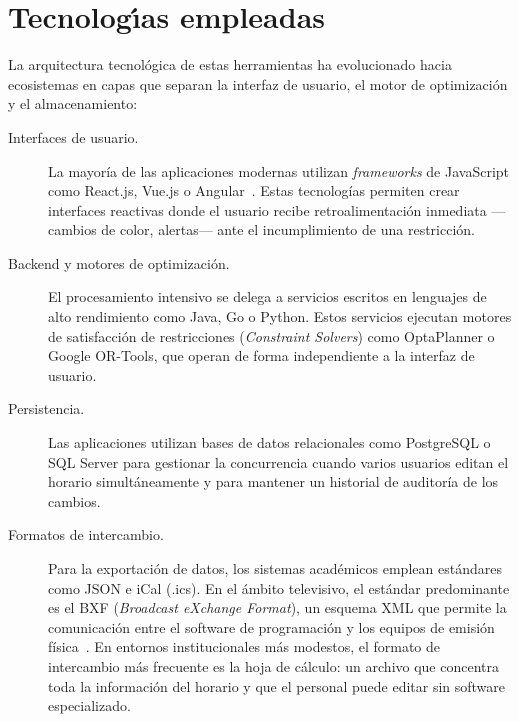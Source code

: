 \section{Tecnolog\'{\i}as empleadas}
\label{sec:tecnologias-existentes}

La arquitectura tecnológica de estas herramientas ha evolucionado hacia
ecosistemas en capas que separan la interfaz de usuario, el motor de
optimización y el almacenamiento:

\begin{description}
  \item[Interfaces de usuario.] La mayoría de las aplicaciones modernas
    utilizan \textit{frameworks} de JavaScript como React.js, Vue.js o
    Angular~\cite{garcia2024}.  Estas tecnologías permiten crear interfaces
    reactivas donde el usuario recibe retroalimentación inmediata ---cambios
    de color, alertas--- ante el incumplimiento de una restricción.

  \item[Backend y motores de optimizaci\'on.] El procesamiento intensivo se
    delega a servicios escritos en lenguajes de alto rendimiento como Java,
    Go o Python.  Estos servicios ejecutan motores de satisfacción de
    restricciones (\textit{Constraint Solvers}) como OptaPlanner o Google
    OR-Tools, que operan de forma independiente a la interfaz de usuario.

  \item[Persistencia.] Las aplicaciones utilizan bases de datos relacionales
    como PostgreSQL o SQL Server para gestionar la concurrencia cuando varios
    usuarios editan el horario simultáneamente y para mantener un historial
    de auditoría de los cambios.

  \item[Formatos de intercambio.] Para la exportación de datos, los sistemas
    académicos emplean estándares como JSON e iCal (.ics).  En el ámbito
    televisivo, el estándar predominante es el BXF (\textit{Broadcast
    eXchange Format}), un esquema XML que permite la comunicación entre el
    software de programación y los equipos de emisión física~\cite{smpte2021}.
    En entornos institucionales más modestos, el formato de intercambio más
    frecuente es la hoja de cálculo: un archivo \xlsx{} que concentra toda
    la información del horario y que el personal puede editar sin software
    especializado.
\end{description}

